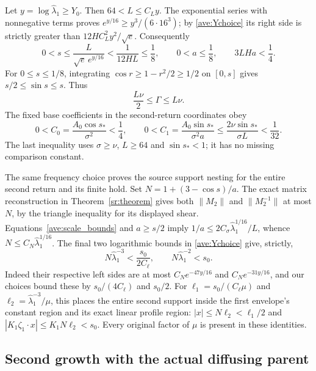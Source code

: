 Let $y=\log\widehat\lambda_1\geq Y_0$.
Then $64<L\leq C_Ly$. The exponential series with nonnegative
terms proves $e^{y/16}\geq y^3/(6\cdot16^3)$; by
\eqref{ave:Ychoice} its right side is strictly greater than
$12HC_L^2y^2/\sqrt e$. Consequently
\begin{equation}\label{ave:angle_bounds}
 0<s\leq\frac{L}{\sqrt e\,e^{y/16}}
      <\frac1{12HL}\leq\frac18,
 \qquad 0<a\leq\frac18,
 \qquad 3LHa<\frac14.
\end{equation}
For $0\leq s\leq1/8$, integrating $\cos r\geq1-r^2/2\geq1/2$
on $[0,s]$ gives $s/2\leq\sin s\leq s$. Thus
\begin{equation}\label{ave:Gamma_bounds}
 \frac{L\nu}{2}\leq\Gamma\leq L\nu.
\end{equation}
The fixed base coefficients in the second-return coordinates obey
\begin{equation}\label{ave:C_bounds}
 0<C_0=\frac{A_0\cos s_*}{\sigma^2}<\frac14,
 \qquad 0<C_1=\frac{A_0\sin s_*}{\sigma^2a}
 \leq\frac{2\nu\sin s_*}{\sigma L}<\frac1{32}.
\end{equation}
The last inequality uses $\sigma\geq\nu$, $L\geq64$ and
$\sin s_*<1$; it has no missing comparison constant.

The same frequency choice proves the source support nesting for the
entire second return and its finite hold. Set
$N=1+(3-\cos s)/a$. The exact matrix reconstruction in
Theorem~\ref{sr:theorem} gives both $\|M_2\|$ and $\|M_2^{-1}\|$
at most $N$, by the triangle inequality for its displayed shear.
Equations~\eqref{ave:scale_bounds} and $a\geq s/2$ imply
$1/a\leq 2C_\sigma\widehat\lambda_1^{1/16}/L$, whence
$N\leq C_N\widehat\lambda_1^{1/16}$.
The final two logarithmic bounds in \eqref{ave:Ychoice} give, strictly,
\begin{equation}\label{ave:nesting}
 N\widehat\lambda_1^{-3}<\frac{s_0}{2C_\ell},
 \qquad N\widehat\lambda_1^{-2}<s_0.
\end{equation}
Indeed their respective left sides are at most
$C_Ne^{-47y/16}$ and $C_Ne^{-31y/16}$, and our choices bound these
by $s_0/(4C_\ell)$ and $s_0/2$.
For $\ell_1=s_0/(C_\ell\mu)$ and
$\ell_2=\widehat\lambda_1^{-3}/\mu$, this places the entire second
support inside the first envelope's constant region and its exact
linear profile region: $|x|\leq N\ell_2<\ell_1/2$ and
$|K_1\zeta_1\cdot x|\leq K_1N\ell_2<s_0$.
Every original factor of $\mu$ is present in these identities.

\subsection{Second growth with the actual diffusing parent}

